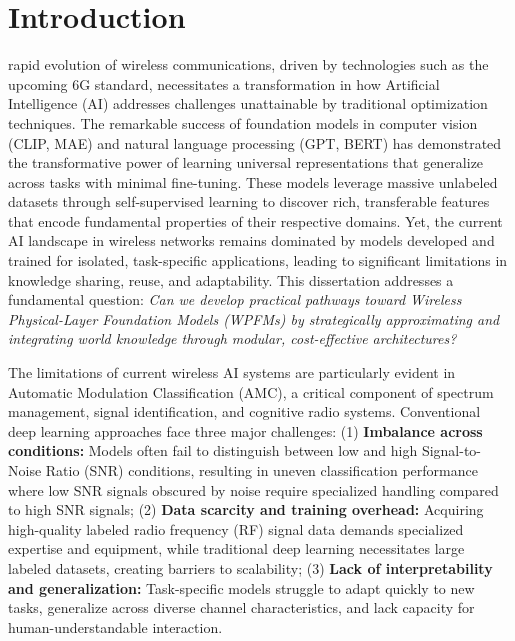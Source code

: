 %
%

\chapter{Introduction}
\label{chap:intro}

 rapid evolution of wireless communications, driven by technologies such as the upcoming 6G standard\cite{fontaine2024towards}, necessitates a transformation in how Artificial Intelligence (AI) addresses challenges unattainable by traditional optimization techniques. The remarkable success of foundation models in computer vision (CLIP\cite{radford2021learning}, MAE\cite{he2022masked}) and natural language processing (GPT\cite{10500411}, BERT\cite{devlin2019bert}) has demonstrated the transformative power of learning universal representations that generalize across tasks with minimal fine-tuning. These models leverage massive unlabeled datasets through self-supervised learning to discover rich, transferable features that encode fundamental properties of their respective domains. Yet, the current AI landscape in wireless networks remains dominated by models developed and trained for isolated, task-specific applications\cite{fontaine2024towards}, leading to significant limitations in knowledge sharing, reuse, and adaptability. This dissertation addresses a fundamental question: \textit{Can we develop practical pathways toward Wireless Physical-Layer Foundation Models (WPFMs) by strategically approximating and integrating world knowledge through modular, cost-effective architectures?}

The limitations of current wireless AI systems are particularly evident in Automatic Modulation Classification (AMC), a critical component of spectrum management, signal identification, and cognitive radio systems\cite{gao2023moe}. Conventional deep learning approaches face three major challenges: (1) \textbf{Imbalance across conditions:} Models often fail to distinguish between low and high Signal-to-Noise Ratio (SNR) conditions\cite{gao2023moe}, resulting in uneven classification performance where low SNR signals obscured by noise require specialized handling compared to high SNR signals; (2) \textbf{Data scarcity and training overhead:} Acquiring high-quality labeled radio frequency (RF) signal data demands specialized expertise and equipment, while traditional deep learning necessitates large labeled datasets\cite{kong2023transformer}, creating barriers to scalability; (3) \textbf{Lack of interpretability and generalization:} Task-specific models struggle to adapt quickly to new tasks, generalize across diverse channel characteristics, and lack capacity for human-understandable interaction\cite{gao2023moe}.

